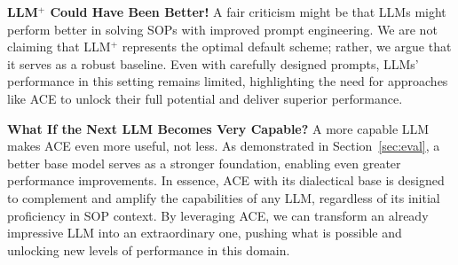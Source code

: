 \textbf{LLM$^+$ Could Have Been Better!}
A fair criticism might be that LLMs might perform better in solving SOPs with improved prompt engineering. We are not claiming that LLM$^+$ represents the optimal default scheme; rather, we argue that it serves as a robust baseline. Even with carefully designed prompts, LLMs' performance in this setting remains limited, highlighting the need for approaches like ACE to unlock their full potential and deliver superior performance.

\textbf{What If the Next LLM Becomes Very Capable?} 
A more capable LLM makes ACE even more useful, not less. As demonstrated in Section~\ref{sec:eval}, a better base model serves as a stronger foundation, enabling even greater performance improvements. In essence, ACE with its dialectical base is designed to complement and amplify the capabilities of any LLM, regardless of its initial proficiency in SOP context. By leveraging ACE, we can transform an already impressive LLM into an extraordinary one, pushing what is possible and unlocking new levels of performance in this domain.


